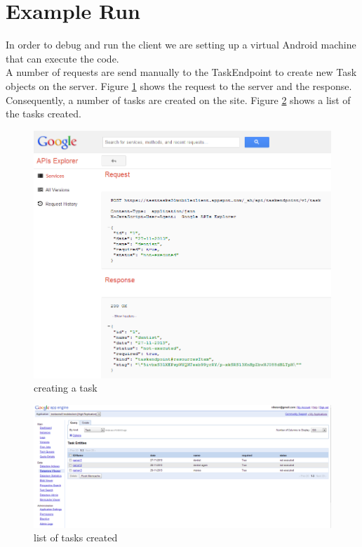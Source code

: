 \pagebreak

\section{Example Run}
In order to debug and run the client we are setting up a virtual Android machine that can execute the code.\\

A number of requests are send manually to the TaskEndpoint to create new Task objects on the server. Figure \ref{mobile_json_figure} shows the request to the server and the response. Consequently, a number of tasks are created on the site. Figure \ref{mobile_task_list_figure} shows a list of the tasks created.\\

\begin{figure}[H]
	\centering
	\includegraphics[scale=0.7]{images/googlecloud__createtask.png}
	\caption{creating a task}
	\label{mobile_json_figure}
\end{figure}
\begin{figure}[H]
	\centering
	\includegraphics[scale=0.5]{images/googlecloud__taskexist.png}
	\caption{list of tasks created}
	\label{mobile_task_list_figure}
\end{figure}

